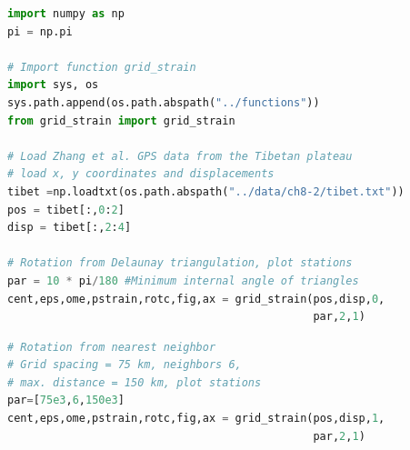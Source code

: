 \documentclass[a4paper , 12pt]{book}
\begin{document}
\begin{center}
\begin{lstlisting}[language=Python, frame=single]
import numpy as np
pi = np.pi

# Import function grid_strain
import sys, os
sys.path.append(os.path.abspath("../functions"))
from grid_strain import grid_strain

# Load Zhang et al. GPS data from the Tibetan plateau
# load x, y coordinates and displacements
tibet =np.loadtxt(os.path.abspath("../data/ch8-2/tibet.txt"))
pos = tibet[:,0:2]
disp = tibet[:,2:4] 

# Rotation from Delaunay triangulation, plot stations
par = 10 * pi/180 #Minimum internal angle of triangles
cent,eps,ome,pstrain,rotc,fig,ax = grid_strain(pos,disp,0,
                                               par,2,1)
\end{lstlisting}
\end{center}

\begin{center}
\begin{lstlisting}[language=Python, frame=single]
# Rotation from nearest neighbor 
# Grid spacing = 75 km, neighbors 6, 
# max. distance = 150 km, plot stations
par=[75e3,6,150e3]
cent,eps,ome,pstrain,rotc,fig,ax = grid_strain(pos,disp,1,
                                               par,2,1)
\end{lstlisting}
\end{center}
\end{document}
